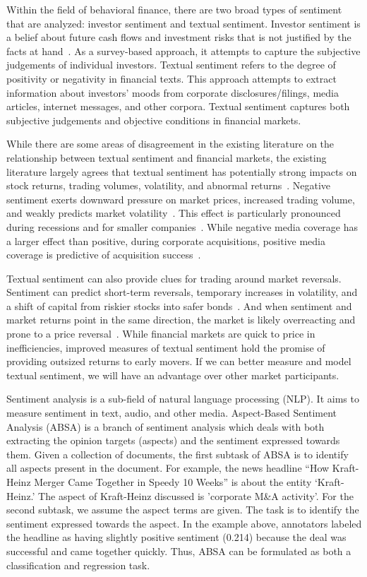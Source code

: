 Within the field of behavioral finance, there are two broad types of sentiment that are analyzed: investor sentiment and textual sentiment.
Investor sentiment is a belief about future cash flows and investment risks that is not justified by the facts at hand~\citep{BakerMalcolm2007ISit}.
As a survey-based approach, it attempts to capture the subjective judgements of individual investors.
Textual sentiment refers to the degree of positivity or negativity in financial texts.
This approach attempts to extract information about investors’ moods from corporate disclosures/filings, media articles, internet messages, and other corpora.
Textual sentiment captures both subjective judgements and objective conditions in financial markets.

While there are some areas of disagreement in the existing literature on the relationship between textual sentiment and financial markets, the existing literature largely agrees that textual sentiment has potentially strong impacts on stock returns, trading volumes, volatility, and abnormal returns~\citep{KearneyColm2014Tsif}.
Negative sentiment exerts downward pressure on market prices, increased trading volume, and weakly predicts market volatility~\citep{TetlockPaul2007GCtI}.
This effect is particularly pronounced during recessions \citep{garciadiego2013SdR} and for smaller companies~\citep{FergusonNickyJ2015MCaS}.
While negative media coverage has a larger effect than positive, during corporate acquisitions, positive media coverage is predictive of acquisition success~\citep{buehlmaier2015role}.

Textual sentiment can also provide clues for trading around market reversals.
Sentiment can predict short-term reversals, temporary increases in volatility, and a shift of capital from riskier stocks into safer bonds~\citep{DaZhi2015TSoA}.
And when sentiment and market returns point in the same direction, the market is likely overreacting and prone to a price reversal~\citep{froot2017media}.
While financial markets are quick to price in inefficiencies, improved measures of textual sentiment hold the promise of providing outsized returns to early movers.
If we can better measure and model textual sentiment, we will have an advantage over other market participants.

Sentiment analysis is a sub-field of natural language processing (NLP).
It aims to measure sentiment in text, audio, and other media. Aspect-Based Sentiment Analysis (ABSA) is a branch of sentiment analysis which deals with both extracting the opinion targets (aspects) and the sentiment expressed towards them.
Given a collection of documents, the first subtask of ABSA is to identify all aspects present in the document.
For example, the news headline “How Kraft-Heinz Merger Came Together in Speedy 10 Weeks” is about the entity ‘Kraft-Heinz.’ The aspect of Kraft-Heinz discussed is 'corporate M\&A activity'.
For the second subtask, we assume the aspect terms are given.
The task is to identify the sentiment expressed towards the aspect.
In the example above, annotators labeled the headline as having slightly positive sentiment (0.214) because the deal was successful and came together quickly.
Thus, ABSA can be formulated as both a classification and regression task.


